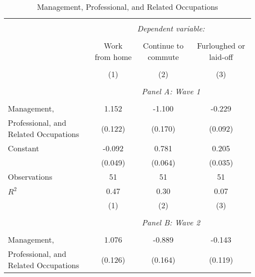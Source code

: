 \begin{table}[!htbp] \centering                    \caption{Management, Professional, and Related Occupations}                    \label{tab:priorindustry}                  \small                  \begin{tabular}{@{\extracolsep{5pt}}lccc}                  \\[-1.8ex]\hline                  \hline \\[-1.8ex]                   & \multicolumn{3}{c}{\textit{Dependent variable:}} \\                   \cline{2-4}                   \\[-1.8ex] & Work from home & Continue to commute & Furloughed or laid-off \\                   \hline \\[-1.8ex]               
                    &\multicolumn{1}{c}{(1)}         &\multicolumn{1}{c}{(2)}         &\multicolumn{1}{c}{(3)}         \\
\hline \\               &
\multicolumn{3}{c}{\textit{Panel A: Wave 1}} \\               \addlinespace[1mm] \\
Management,         &       1.152\sym{***}&      -1.100\sym{***}&      -0.229\sym{**} \\
Professional, and Related Occupations&     (0.122)         &     (0.170)         &     (0.092)         \\
[1em]
Constant            &      -0.092\sym{*}  &       0.781\sym{***}&       0.205\sym{***}\\
                    &     (0.049)         &     (0.064)         &     (0.035)         \\
[1em]
Observations        &          51         &          51         &          51         \\
\(R^{2}\)           &        0.47         &        0.30         &        0.07         \\
                    &\multicolumn{1}{c}{(1)}         &\multicolumn{1}{c}{(2)}         &\multicolumn{1}{c}{(3)}         \\
\hline \\               & \multicolumn{3}{c}{\textit{Panel B: Wave 2}} \\               \addlinespace[1mm] \\
Management,         &       1.076\sym{***}&      -0.889\sym{***}&      -0.143         \\
Professional, and Related Occupations&     (0.126)         &     (0.164)         &     (0.119)         \\

\end{tabular}
\end{table}
